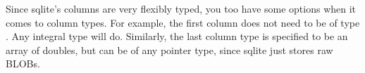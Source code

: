 

Since sqlite's columns are very flexibly typed, you too have some options when it comes to column types. For example, the first column does not need to be of type . Any integral type will do. Similarly, the last column type is specified to be an array of doubles, but can be of any pointer type, since sqlite just stores raw BLOBs.

